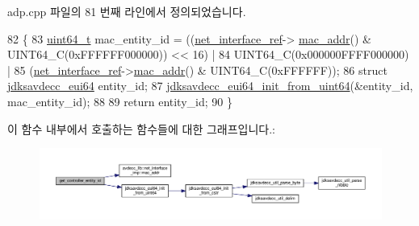 adp.\+cpp 파일의 81 번째 라인에서 정의되었습니다.


\begin{DoxyCode}
82 \{
83     \hyperlink{parse_8c_aec6fcb673ff035718c238c8c9d544c47}{uint64\_t} mac\_entity\_id = ((\hyperlink{namespaceavdecc__lib_adb4da03bc65b7846cc240ee919bbde19}{net\_interface\_ref}->
      \hyperlink{classavdecc__lib_1_1net__interface__imp_a742e975c065f9067f42182847df080da}{mac\_addr}() & UINT64\_C(0xFFFFFF000000)) << 16) |
84                              UINT64\_C(0x000000FFFF000000) |
85                              (\hyperlink{namespaceavdecc__lib_adb4da03bc65b7846cc240ee919bbde19}{net\_interface\_ref}->\hyperlink{classavdecc__lib_1_1net__interface__imp_a742e975c065f9067f42182847df080da}{mac\_addr}() & UINT64\_C(0xFFFFFF));
86     \textcolor{keyword}{struct }\hyperlink{structjdksavdecc__eui64}{jdksavdecc\_eui64} entity\_id;
87     \hyperlink{group__eui64_gae410f4c2dc9cbd68690e1a09912ee4f3}{jdksavdecc\_eui64\_init\_from\_uint64}(&entity\_id, mac\_entity\_id);
88 
89     \textcolor{keywordflow}{return} entity\_id;
90 \}
\end{DoxyCode}


이 함수 내부에서 호출하는 함수들에 대한 그래프입니다.\+:
\nopagebreak
\begin{figure}[H]
\begin{center}
\leavevmode
\includegraphics[width=350pt]{classavdecc__lib_1_1adp_a0c0959a46658c0a22e9530334b2912da_cgraph}
\end{center}
\end{figure}




